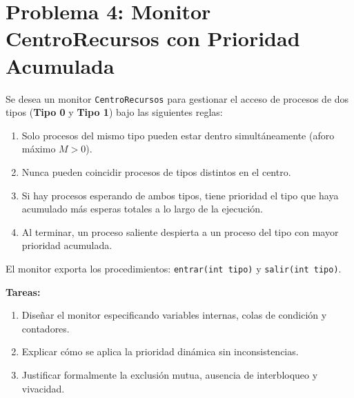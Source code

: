 \documentclass[11pt,a4paper,twoside,openright]{report}
\begin{document}
\newpage

\section{Problema 4: Monitor CentroRecursos con Prioridad Acumulada}

\begin{ejercicio}
Se desea un monitor \texttt{CentroRecursos} para gestionar el acceso de procesos de dos tipos (\textbf{Tipo 0} y \textbf{Tipo 1}) bajo las siguientes reglas:
\begin{enumerate}
    \item Solo procesos del mismo tipo pueden estar dentro simultáneamente (aforo máximo $M > 0$).
    \item Nunca pueden coincidir procesos de tipos distintos en el centro.
    \item Si hay procesos esperando de ambos tipos, tiene prioridad el tipo que haya acumulado más esperas totales a lo largo de la ejecución.
    \item Al terminar, un proceso saliente despierta a un proceso del tipo con mayor prioridad acumulada.
\end{enumerate}
El monitor exporta los procedimientos: \texttt{entrar(int tipo)} y \texttt{salir(int tipo)}.

\textbf{Tareas:}
\begin{enumerate}[label=(\alph*)]
    \item Diseñar el monitor especificando variables internas, colas de condición y contadores.
    \item Explicar cómo se aplica la prioridad dinámica sin inconsistencias.
    \item Justificar formalmente la exclusión mutua, ausencia de interbloqueo y vivacidad.
\end{enumerate}
\end{ejercicio}
\end{document}
